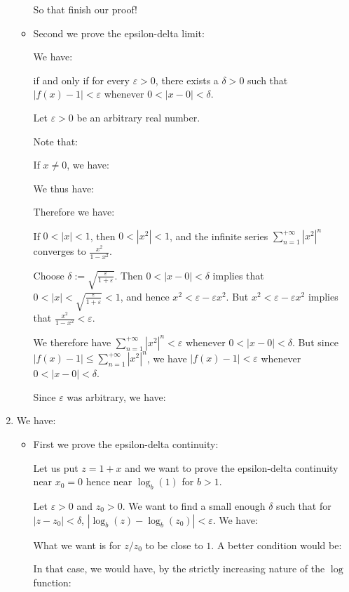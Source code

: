 \begin{enumerate}
\begin{itemize}
			So that finish our proof!
			
			\item Second we prove the epsilon-delta limit:
			
			We have:
			
			if and only if for every $\varepsilon>0$, there exists a $\delta>0$ such that $|f(x)-1|<\varepsilon$ whenever $0<|x-0|<\delta$.

			Let $\varepsilon>0$ be an arbitrary real number.
			
			Note that:
			
			If $x \neq 0$, we have:
			
			We thus have:
			
			Therefore we have:
			
			If $0<|x|<1$, then $0<\left|x^2\right|<1$, and the infinite series $\sum_{n=1}^{+\infty}\left|x^2\right|^n$ converges to $\frac{x^2}{1-x^2}$.
			
			Choose $\delta:=\sqrt{\frac{\varepsilon}{1+\varepsilon}}$. Then $0<|x-0|<\delta$ implies that $0<|x|<\sqrt{\frac{\varepsilon}{1+\varepsilon}}<1$, and hence $x^2<\varepsilon-\varepsilon x^2$. But $x^2<\varepsilon-\varepsilon x^2$ implies that $\frac{x^2}{1-x^2}<\varepsilon$.
			
			We therefore have $\sum_{n=1}^{+\infty}\left|x^2\right|^n<\varepsilon$ whenever $0<|x-0|<\delta$. But since $|f(x)-1| \leq \sum_{n=1}^{+\infty}\left|x^2\right|^n$, we have $|f(x)-1|<\varepsilon$ whenever $0<|x-0|<\delta$.
			
			Since $\varepsilon$ was arbitrary, we have: 
			
			
		\end{itemize}
		
		\item We have:
		
		
		\begin{itemize}
			\item First we prove the epsilon-delta continuity:
			
			Let us put $z=1+x$ and we want to prove the epsilon-delta continuity near $x_0=0$ hence near $\log_b(1)$ for $b>1$.
			
			Let $\varepsilon>0$ and $z_0>0$. We want to find a small enough $\delta$ such that for $\left|z-z_0\right|<\delta$, $\left|\log_b(z)-\log_b\left(z_0\right)\right|<\varepsilon$. We have:
			
			What we want is for $z/z_0$ to be close to $1$. A better condition would be:
			
			In that case, we would have, by the strictly increasing nature of the $\log$ function:
			

\end{itemize}
\end{enumerate}

